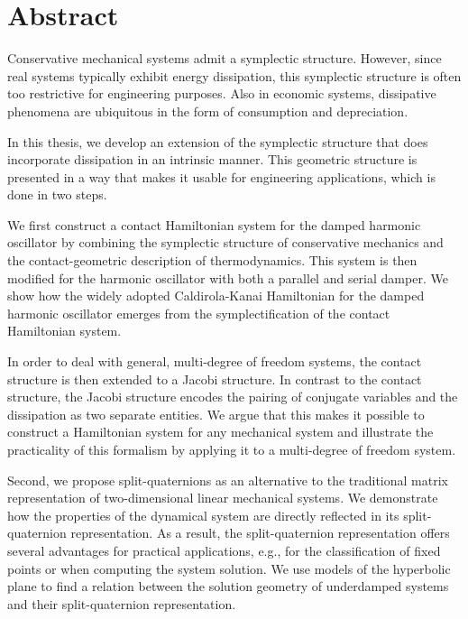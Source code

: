 \chapter*{Abstract}%

Conservative mechanical systems admit a symplectic structure. 
However, since real systems typically exhibit energy dissipation, this symplectic structure is often too restrictive for engineering purposes. 
Also in economic systems, dissipative phenomena are ubiquitous in the form of consumption and depreciation. 

In this thesis, we develop an extension of the symplectic structure that does incorporate dissipation in an intrinsic manner. 
This geometric structure is presented in a way that makes it usable for engineering applications, which is done in two steps.

We first construct a contact Hamiltonian system for the damped harmonic oscillator by combining the symplectic structure of conservative mechanics and the contact-geometric description of thermodynamics. 
This system is then modified for the harmonic oscillator with both a parallel and serial damper. 
We show how the widely adopted Caldirola-Kanai Hamiltonian for the damped harmonic oscillator emerges from the symplectification of the contact Hamiltonian system. 

In order to deal with general, multi-degree of freedom systems, the contact structure is then extended to a Jacobi structure.
In contrast to the contact structure, the Jacobi structure encodes the pairing of conjugate variables and the dissipation as two separate entities. We argue that this makes it possible to construct a Hamiltonian system for any mechanical system and illustrate the practicality of this formalism by applying it to a multi-degree of freedom system.

Second, we propose split-quaternions as an alternative to the traditional matrix representation of two-dimensional linear mechanical systems. 
We demonstrate how the properties of the dynamical system are directly reflected in its split-quaternion representation. 
As a result, the split-quaternion representation offers several advantages for practical applications, e.g., for the classification of fixed points or when computing the system solution. 
We use models of the hyperbolic plane to find a relation between the solution geometry of underdamped systems and their split-quaternion representation.
 
 
